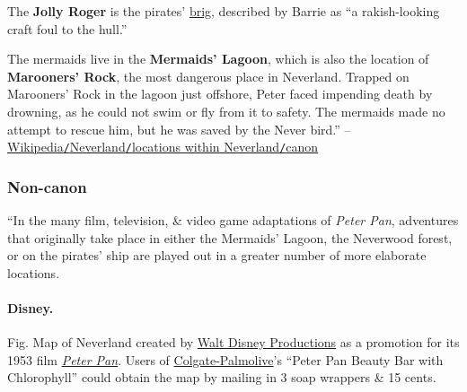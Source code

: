\documentclass[oneside]{book}
\numberwithin{equation}{section}
\begin{document}
The \textbf{Jolly Roger} is the pirates' \href{https://en.wikipedia.org/wiki/Brig}{brig}, described by Barrie as ``a rakish-looking craft foul to the hull.''

The mermaids live in the \textbf{Mermaids' Lagoon}, which is also the location of \textbf{Marooners' Rock}, the most dangerous place in Neverland. Trapped on Marooners' Rock in the lagoon just offshore, Peter faced impending death by drowning, as he could not swim or fly from it to safety. The mermaids made no attempt to rescue him, but he was saved by the Never bird.'' -- \href{https://en.wikipedia.org/wiki/Neverland#Canon}{Wikipedia\texttt{/}Neverland\texttt{/}locations within Neverland\texttt{/}canon}

\subsubsection{Non-canon}
``In the many film, television, \& video game adaptations of \textit{Peter Pan}, adventures that originally take place in either the Mermaids' Lagoon, the Neverwood forest, or on the pirates' ship are played out in a greater number of more elaborate locations.

\paragraph{Disney.} \textsf{Fig. Map of Neverland created by \href{https://en.wikipedia.org/wiki/Walt_Disney_Productions}{Walt Disney Productions} as a promotion for its 1953 film \href{https://en.wikipedia.org/wiki/Peter_Pan_(1953_film)}{\textit{Peter Pan}}. Users of \href{https://en.wikipedia.org/wiki/Colgate-Palmolive}{Colgate-Palmolive}'s ``Peter Pan Beauty Bar with Chlorophyll'' could obtain the map by mailing in 3 soap wrappers \& 15 cents.}
\end{document}
